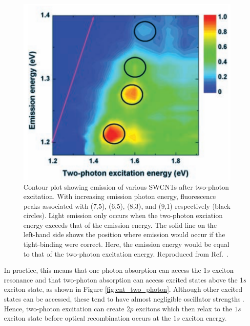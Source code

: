 

\begin{figure}[ht]
	\centering
	\includegraphics[scale=0.3]{images/chapter_optical_props/two_photon_wang}
	\caption{Contour plot showing emission of various SWCNTs after two-photon excitation. With increasing emission photon energy, fluorescence peaks associated with (7,5), (6,5), (8,3), and (9,1) respectively (black circles). Light emission only occurs when the two-photon exciation energy exceeds that of the emission energy. The solid line on the left-hand side shows the position where emission would occur if the tight-binding were correct. Here, the emission energy would be equal to that of the two-photon excitation energy. Reproduced from Ref.\ \cite{wang2005optical}.}
	\label{fig:cnt_two_photon_emission}
\end{figure}

In practice, this means that one-photon absorption can access the 1$s$ exciton resonance and that two-photon absorption can access excited states above the 1$s$ exciton state, as shown in Figure \ref{fig:cnt_two_photon}. Although other excited states can be accessed, these tend to have almost negligible oscillator strengths \cite{wang2005optical}. Hence, two-photon excitation can create $2p$ excitons which then relax to the $1s$ exciton state before optical recombination occurs at the $1s$ exciton energy.

